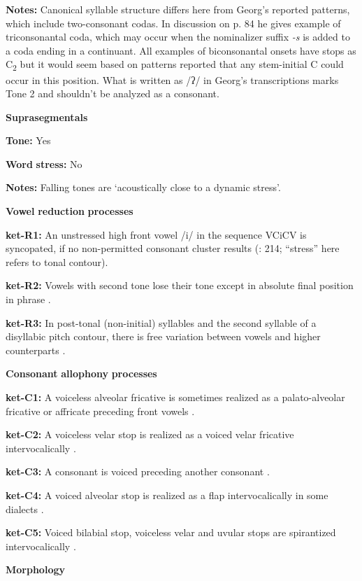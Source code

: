 \textbf{Notes:} Canonical syllable structure differs here from Georg’s reported patterns, which include two-consonant codas. In discussion on p. 84 he gives example of triconsonantal coda, which may occur when the nominalizer suffix \textit{{}-s} is added to a coda ending in a continuant. All examples of biconsonantal onsets have stops as C\textsubscript{2} but it would seem based on patterns reported that any stem-initial C could occur in this position. What is written as /ʔ/ in Georg’s transcriptions marks Tone 2 and shouldn’t be analyzed as a consonant.

\textbf{Suprasegmentals}

\textbf{Tone:} Yes

\textbf{Word} \textbf{stress:} No

\textbf{Notes:} Falling tones are ‘acoustically close to a dynamic stress’.

\textbf{Vowel} \textbf{reduction} \textbf{processes}

\textbf{ket-R1:} An unstressed high front vowel /i/ in the sequence VCiCV is syncopated, if no non-permitted consonant cluster results (\citealt{Georg2007}: 214; “stress” here refers to tonal contour).

\textbf{ket-R2:} Vowels with second tone lose their tone except in absolute final position in phrase \citep[15-16]{Vajda2000}.

\textbf{ket-R3:} In post-tonal (non-initial) syllables and the second syllable of a disyllabic pitch contour, there is free variation between vowels and higher counterparts \citep[11]{Vajda2000}.

\textbf{Consonant} \textbf{allophony} \textbf{processes}

\textbf{ket-C1:} A voiceless alveolar fricative is sometimes realized as a palato-alveolar fricative or affricate preceding front vowels \citep[78]{Georg2007}.

\textbf{ket-C2:} A voiceless velar stop is realized as a voiced velar fricative intervocalically \citep[75]{Georg2007}.

\textbf{ket-C3:} A consonant is voiced preceding another consonant \citep[75]{Georg2007}.

\textbf{ket-C4:} A voiced alveolar stop is realized as a flap intervocalically in some dialects \citep[76]{Georg2007}.

\textbf{ket-C5:} Voiced bilabial stop, voiceless velar and uvular stops are spirantized intervocalically \citep[75-8]{Georg2007}.

\textbf{Morphology}


